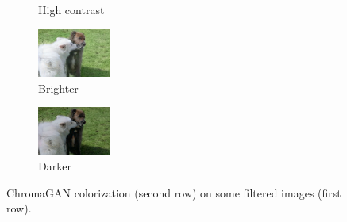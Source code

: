 \begin{figure}[ht]
\begin{subfigure}[b]{0.1\textwidth}
		\caption{High contrast}
	\end{subfigure}
	\hfill
	\begin{subfigure}[b]{0.1\textwidth}
		\includegraphics[width=2.4cm]{c - filter - lumin (1).jpeg}
		\caption{Brighter}
	\end{subfigure}
	\hfill
	\begin{subfigure}[b]{0.1\textwidth}
		\includegraphics[width=2.4cm]{c - filter - lumin (2).jpeg}
		\caption{Darker}
	\end{subfigure}
	\caption{{\small ChromaGAN colorization (second row) on some filtered images (first row).}}
	\label{fig:filter}
\end{figure}
